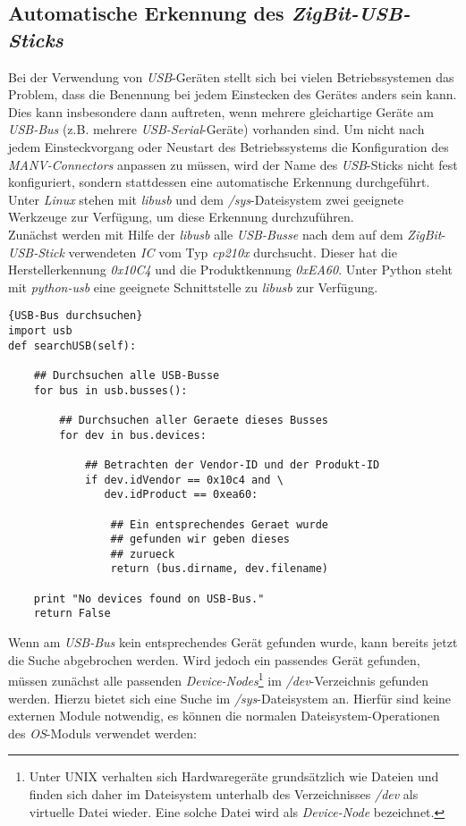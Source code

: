 \subsection{Automatische Erkennung des \emph{ZigBit-USB-Sticks}}\label{usb_stick_erkennen}
Bei der Verwendung von \emph{USB}-Geräten stellt sich bei vielen Betriebssystemen das Problem,
dass die Benennung bei jedem Einstecken des Gerätes anders sein kann. Dies kann insbesondere
dann auftreten, wenn mehrere gleichartige Geräte am \emph{USB-Bus} (z.B. mehrere 
\emph{USB-Serial}-Geräte) vorhanden sind. Um nicht nach jedem Einsteckvorgang oder Neustart des Betriebssystems die
Konfiguration des \emph{MANV-Connectors} anpassen zu müssen, wird der Name des \emph{USB}-Sticks
nicht fest konfiguriert, sondern stattdessen eine automatische Erkennung durchgeführt.
Unter \emph{Linux} stehen mit \emph{libusb} und dem \emph{/sys}-Dateisystem zwei geeignete Werkzeuge
zur Verfügung, um diese Erkennung durchzuführen.\\
Zunächst werden mit Hilfe der \emph{libusb} alle \emph{USB-Busse} nach dem auf dem \emph{ZigBit}-\emph{USB-Stick}
verwendeten \emph{IC} vom Typ \emph{cp210x} durchsucht. Dieser hat die Herstellerkennung \emph{0x10C4} und die
Produktkennung \emph{0xEA60}. Unter Python steht mit \emph{python-usb} eine geeignete Schnittstelle zu
\emph{libusb} zur Verfügung.

\begin{lstlisting}{USB-Bus durchsuchen}
import usb
def searchUSB(self):

    ## Durchsuchen alle USB-Busse 
    for bus in usb.busses():

        ## Durchsuchen aller Geraete dieses Busses
        for dev in bus.devices:

            ## Betrachten der Vendor-ID und der Produkt-ID
            if dev.idVendor == 0x10c4 and \
               dev.idProduct == 0xea60:
               
                ## Ein entsprechendes Geraet wurde 
                ## gefunden wir geben dieses 
                ## zurueck 
                return (bus.dirname, dev.filename)
   
    print "No devices found on USB-Bus."
    return False
\end{lstlisting}

Wenn am \emph{USB-Bus} kein entsprechendes Gerät gefunden wurde, kann bereits jetzt die Suche abgebrochen werden.
Wird jedoch ein passendes Gerät gefunden, müssen zunächst alle passenden \emph{Device-Nodes}\footnote{Unter UNIX
verhalten sich Hardwaregeräte grundsätzlich wie Dateien und finden sich daher im Dateisystem unterhalb
des Verzeichnisses \emph{/dev} als virtuelle Datei wieder. Eine solche Datei wird als \emph{Device-Node} bezeichnet.} im
\emph{/dev}-Verzeichnis gefunden werden. Hierzu bietet sich eine Suche im \emph{/sys}-Dateisystem an. Hierfür sind keine
externen Module notwendig, es können die normalen Dateisystem-Operationen des \emph{OS}-Moduls verwendet werden:

